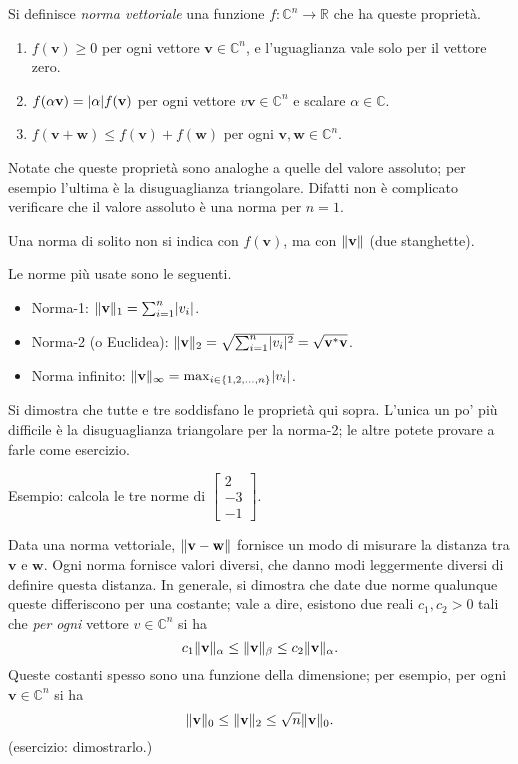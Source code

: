 \documentclass[a4paper]{report}
\DeclarePairedDelimiter{\abs}{\lvert}{\rvert}
\DeclarePairedDelimiter{\norm}{\lVert}{\rVert}
\theoremstyle{definiton}
\theoremstyle{remark}
\begin{document}
Si definisce \emph{norma vettoriale} una funzione $f: \mathbb{C}^n \to \mathbb{R}$ che ha queste proprietà.
\begin{enumerate}
    \item $f(\mathbf{v}) \geq 0$ per ogni vettore $\mathbf{v}\in\mathbb{C}^n$, e l'uguaglianza vale solo per il vettore zero.
    \item $f(\alpha \mathbf{v}) = \abs{\alpha} f(\mathbf{v})$ per ogni vettore $v\mathbf{v}\in\mathbb{C}^n$ e scalare $\alpha \in \mathbb{C}$.
    \item $f(\mathbf{v}+\mathbf{w}) \leq f(\mathbf{v}) + f(\mathbf{w})$ per ogni $\mathbf{v},\mathbf{w}\in\mathbb{C}^n$.
\end{enumerate}
Notate che queste proprietà sono analoghe a quelle del valore assoluto; per esempio l'ultima è la disuguaglianza triangolare. Difatti non è complicato verificare che il valore assoluto è una norma per $n=1$.

Una norma di solito non si indica con $f(\mathbf{v})$, ma con $\norm{\mathbf{v}}$ (due stanghette).

Le norme più usate sono le seguenti.

\begin{itemize}
    \item Norma-1: $\norm{\mathbf{v}}_1 = \sum_{i=1}^n \abs{v_i}$.
    \item Norma-2 (o Euclidea): $\norm{\mathbf{v}}_2 = \sqrt{\sum_{i=1}^n \abs{v_i}^2} = \sqrt{\mathbf{v}^*\mathbf{v}}$.
    \item Norma infinito: $\norm{\mathbf{v}}_\infty = \max_{i\in \{1,2,\dots,n\}} \abs{v_i}$.
\end{itemize}
Si dimostra che tutte e tre soddisfano le proprietà qui sopra. L'unica un po' più difficile è la disuguaglianza triangolare per la norma-2; le altre potete provare a farle come esercizio.

Esempio: calcola le tre norme di $\begin{bmatrix}
    2\\-3\\-1
\end{bmatrix}$.

Data una norma vettoriale, $\norm{\mathbf{v}-\mathbf{w}}$ fornisce un modo di misurare la distanza tra $\mathbf{v}$ e $\mathbf{w}$. Ogni norma fornisce valori diversi, che danno modi leggermente diversi di definire questa distanza. In generale, si dimostra che date due norme qualunque queste differiscono per una costante; vale a dire, esistono due reali $c_1,c_2 > 0$ tali che \emph{per ogni} vettore $v\in\mathbb{C}^n$ si ha
\[
c_1\norm{\mathbf{v}}_\alpha \leq \norm{\mathbf{v}}_\beta \leq c_2 \norm{\mathbf{v}}_\alpha.
\]
Queste costanti spesso sono una funzione della dimensione; per esempio, per ogni $\mathbf{v}\in\mathbb{C}^n$ si ha
\[
\norm{\mathbf{v}}_0 \leq \norm{\mathbf{v}}_2 \leq \sqrt{n}\norm{\mathbf{v}}_0.
\]
(esercizio: dimostrarlo.)
\end{document}
